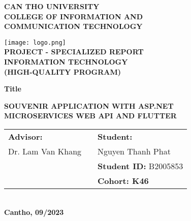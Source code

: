 
\begin{titlepage}

    \begin{center}

        \textbf{CAN THO UNIVERSITY\\}
        \textbf{COLLEGE OF INFORMATION AND\\ COMMUNICATION TECHNOLOGY\\[1cm]}

        \texttt{[image: logo.png]}\\[1cm]

        \textbf{PROJECT - SPECIALIZED REPORT \\}
        \textbf{  INFORMATION TECHNOLOGY \\}
        \textbf{(HIGH-QUALITY PROGRAM)\\[2cm]}

        \begin{large}
            \textbf{Title\\[0.5cm]}
        \end{large}
        \textbf{{\Large SOUVENIR APPLICATION WITH ASP.NET\\ MICROSERVICES WEB API AND FLUTTER}}
        \\[3.5cm]

        \begin{tabular}{ l c l l }
            \textbf{Advisor:} & \hspace{2cm} & \multicolumn{2}{l}{\textbf{Student:}}             \\
            Dr. Lam Van Khang &              & Nguyen Thanh Phat                                 \\
                              &              & \multicolumn{2}{l}{\textbf{Student ID:} B2005853} \\
                              &              & \multicolumn{2}{l}{\textbf{Cohort: K46}}
        \end{tabular}
        \\[4cm]

        \textbf{Cantho, 09/2023}

    \end{center}

\end{titlepage}